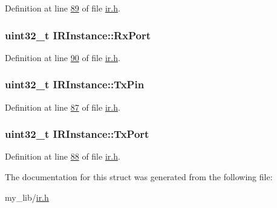 Definition at line \hyperlink{ir_8h_source_l00089}{89} of file \hyperlink{ir_8h_source}{ir.\-h}.

\hypertarget{struct_i_r_instance_a5202eb791e1291a983144f72a457d38d}{
\subsubsection[{Rx\-Port}]{\setlength{\rightskip}{0pt plus 5cm}uint32\-\_\-t I\-R\-Instance\-::\-Rx\-Port}}\label{struct_i_r_instance_a5202eb791e1291a983144f72a457d38d}


Definition at line \hyperlink{ir_8h_source_l00090}{90} of file \hyperlink{ir_8h_source}{ir.\-h}.

\hypertarget{struct_i_r_instance_ad8db5c2b6d458ef94408fc171aa7fabc}{
\subsubsection[{Tx\-Pin}]{\setlength{\rightskip}{0pt plus 5cm}uint32\-\_\-t I\-R\-Instance\-::\-Tx\-Pin}}\label{struct_i_r_instance_ad8db5c2b6d458ef94408fc171aa7fabc}


Definition at line \hyperlink{ir_8h_source_l00087}{87} of file \hyperlink{ir_8h_source}{ir.\-h}.

\hypertarget{struct_i_r_instance_a0491d3193cddc5b568be222f147dcfcc}{
\subsubsection[{Tx\-Port}]{\setlength{\rightskip}{0pt plus 5cm}uint32\-\_\-t I\-R\-Instance\-::\-Tx\-Port}}\label{struct_i_r_instance_a0491d3193cddc5b568be222f147dcfcc}


Definition at line \hyperlink{ir_8h_source_l00088}{88} of file \hyperlink{ir_8h_source}{ir.\-h}.



The documentation for this struct was generated from the following file\-:\begin{DoxyCompactItemize}
\item 
my\-\_\-lib/\hyperlink{ir_8h}{ir.\-h}\end{DoxyCompactItemize}
